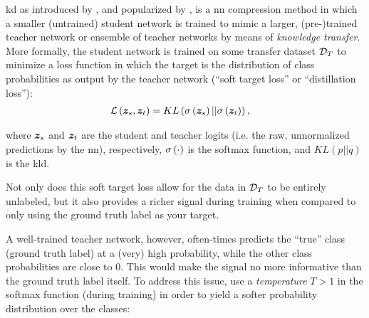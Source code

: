 

\gls{kd} as introduced by \citet{bucil2006model}, and popularized by \citet{hinton2015distilling}, is a \gls{nn} compression method in which a smaller (untrained) student network is trained to mimic a larger, (pre-)trained teacher network or ensemble of teacher networks by means of \emph{knowledge transfer}. More formally, the student network is trained on some transfer dataset $\mathcal{D}_T$ to minimize a loss function in which the target is the distribution of class probabilities as output by the teacher network (``soft target loss'' or ``distillation loss''):
\begin{align}
    \label{eq:soft_target_loss}
    \loss{\vect{z}_s, \vect{z}_t} &= KL\left( \softmax{\vect{z}_s} || \softmax{\vect{z}_t} \right),
\end{align}

where $\vect{z}_s$ and $\vect{z}_t$ are the student and teacher logits (i.e. the raw, unnormalized predictions by the \gls{nn}), respectively, $\sigma\left({\cdot}\right)$ is the softmax function, and $KL(p || q)$ is the \gls{kld}.

Not only does this soft target loss allow for the data in $\mathcal{D}_T$ to be entirely unlabeled, but it also provides a richer signal during training when compared to only using the ground truth label as your target.

A well-trained teacher network, however, often-times predicts the ``true'' class (ground truth label) at a (very) high probability, while the other class probabilities are close to $0$. This would make the signal no more informative than the ground truth label itself. To address this issue, \citet{hinton2015distilling} use a \emph{temperature} $T > 1$ in the softmax function (during training) in order to yield a softer probability distribution over the classes:

